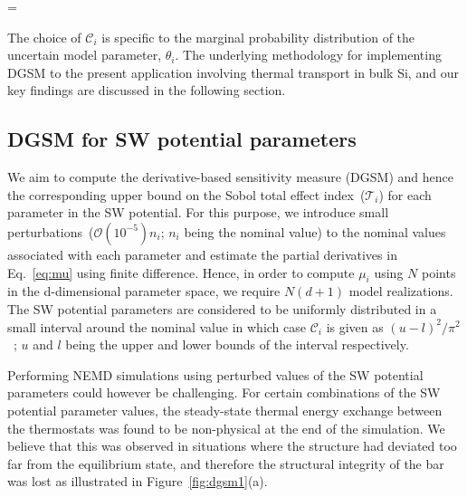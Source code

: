 \be
{} =  
\ee

\noindent The choice of $\mathcal{C}_i$ is specific to the marginal probability distribution of the uncertain model
parameter, $\theta_i$. 
The underlying methodology for implementing DGSM to the present application involving thermal transport in bulk Si,
and our key findings are discussed in the following section. 

\subsection{DGSM for SW potential parameters}
\label{sub:dgsm} 

We aim to compute the derivative-based sensitivity measure (DGSM) and hence the corresponding upper bound on the
Sobol total effect index~($\mathcal{T}_i$) for each parameter in the SW potential. For this purpose, we 
introduce small perturbations~($\mathcal{O}(10^{-5})n_i$; $n_i$ being the nominal value) to the nominal values
associated with each parameter and estimate the partial derivatives in Eq.~\ref{eq:mu} using finite difference. 
Hence, in order to compute $\mu_i$ using $N$ points in the d-dimensional parameter space, we require $N(d+1)$
model realizations. The SW potential parameters are considered to be uniformly distributed in a small interval
around the nominal value in which case $\mathcal{C}_i$ is given as $(u-l)^{2}/\pi^2$~\cite{Roustant:2014}; $u$
and $l$ being the upper and lower bounds of the interval respectively.   

Performing NEMD simulations using perturbed values of the SW potential parameters could however be challenging.
For certain combinations of the SW potential parameter values, the steady-state thermal
energy exchange between the thermostats was found to be non-physical at the end of the simulation. We believe that
this was observed in situations 
where the structure had deviated too far from the equilibrium state, and therefore the
structural integrity of the bar was lost as illustrated in Figure~\ref{fig:dgsm1}(a). 

